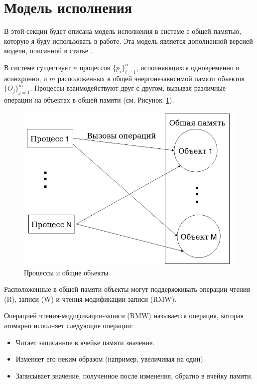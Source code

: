 \documentclass[times,specification,annotation]{itmo-student-thesis}
\begin{document}
\section{Модель исполнения}

В этой секции будет описана модель исполнения в системе с общей памятью, которую я буду использовать в работе. Эта модель является дополненной версией модели, описанной в статье \cite{attiya2018nesting}.

В системе существует $n$ процессов $\{p_i\}_{i=1}^n$, исполняющихся одновременно и асинхронно, и $m$ расположенных в общей энергонезависимой памяти объектов $\{O_j\}_{j=1}^m$. Процессы взаимодействуют друг с другом, вызывая различные операции на объектах в общей памяти (см. Рисунок~\ref{model-shared-pic}).

\begin{figure}[H]
  \centering
  \caption{Процессы и общие объекты}
  \label{model-shared-pic}
  \includegraphics[width=\linewidth]{model_shared.png}
\end{figure}

Расположенные в общей памяти объекты могут поддержживать операции чтения (R), записи (W) и чтения-модификации-записи (RMW). 

Операцией чтения-модификации-записи (RMW) называется операция, которая атомарно исполняет следующие операции:
\begin{itemize}
    \item Читает записанное в ячейке памяти значение.
    
    \item Изменяет его неким образом (например, увеличивая на один).
    
    \item Записывает значение, полученное после изменения, обратно в ячейку памяти.
\end{itemize}
\end{document}
